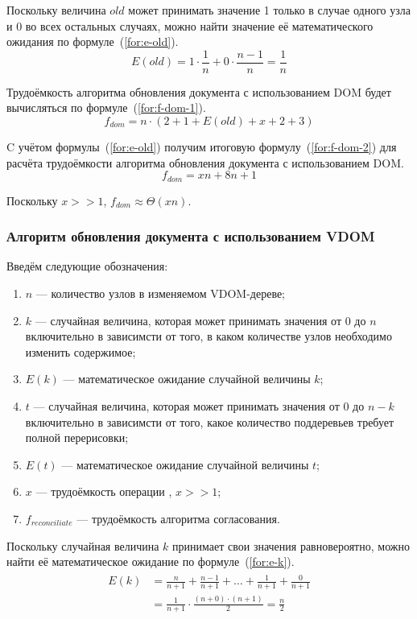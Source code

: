 Поскольку величина $old$ может принимать значение 1 только в случае одного узла и 0 во всех остальных случаях, можно найти значение её математического ожидания по формуле~(\ref{for:e-old}).
\begin{equation}
	\label{for:e-old}
	E(old) = 1 \cdot \frac{1}{n} + 0 \cdot \frac{n - 1}{n} = \frac{1}{n}
\end{equation}

Трудоёмкость алгоритма обновления документа с использованием DOM будет вычисляться по формуле~(\ref{for:f-dom-1}).
\begin{equation}
	\label{for:f-dom-1}
	f_{dom} = n \cdot (2 + 1 + E(old) + x + 2 + 3)
\end{equation}

C учётом формулы~(\ref{for:e-old}) получим итоговую формулу~(\ref{for:f-dom-2}) для расчёта трудоёмкости алгоритма обновления документа с использованием DOM.
\begin{equation}
	\label{for:f-dom-2}
	f_{dom} = xn + 8n + 1
\end{equation}

Поскольку $x >> 1$, $f_{dom} \approx \Theta(xn)$.

\subsubsection{Алгоритм обновления документа с использованием VDOM}
Введём следующие обозначения:
\begin{enumerate}[label=\arabic*)]
	\item $n$ --- количество узлов в изменяемом VDOM-дереве;
	\item $k$ --- случайная величина, которая может принимать значения от 0 до $n$ включительно в зависимсти от того, в каком количестве узлов необходимо изменить содержимое;
	\item $E(k)$ --- математическое ожидание случайной величины $k$;
	\item $t$ --- случайная величина, которая может принимать значения от 0 до $n - k$ включительно в зависимсти от того, какое количество поддеревьев требует полной перерисовки;
	\item $E(t)$ --- математическое ожидание случайной величины $t$;
	\item $x$ --- трудоёмкость операции , $x >> 1$;
	\item $f_{reconciliate}$ --- трудоёмкость алгоритма согласования.
\end{enumerate}

Поскольку случайная величина $k$ принимает свои значения равновероятно, можно найти её математическое ожидание по формуле~(\ref{for:e-k}).
\begin{align}
	\begin{split}
		\label{for:e-k}
		E(k) &= \frac{n}{n + 1} + \frac{n - 1}{n + 1}  + \dotsc + \frac{1}{n + 1} + \frac{0}{n + 1} \\
		&= \frac{1}{n + 1} \cdot \frac{(n + 0)\cdot(n + 1)}{2} = \frac{n}{2}
	\end{split}
\end{align}

